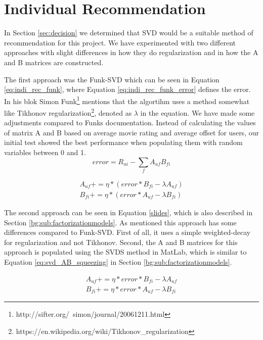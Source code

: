 \section{Individual Recommendation}\label{sec:individual_recommendation}
In Section \ref{sec:decision} we determined that SVD would be a suitable method of recommendation for this project. 
We have experimented with two different approaches with slight differences in how they do regularization and in how the A and B matrices are constructed.

The first approach was the Funk-SVD which can be seen in Equation \ref{eq:indi_rec_funk}, where Equation \ref{eq:indi_rec_funk_error} defines the error\cite{svdsimonfunk}. In his blok Simon Funk\footnote{http://sifter.org/~simon/journal/20061211.html} mentions that the algortihm uses a method somewhat like Tikhonov regularization\footnote{https://en.wikipedia.org/wiki/Tikhonov\_regularization}, denoted as $\lambda$ in the equation. We have made some adjustments compared to Funks documentation\cite{svdsimonfunk}. Instead of calculating the values of matrix A and B based on average movie rating and average offset for users, our initial test showed the best performance when populating them with random variables between 0 and 1.
\begin{equation}\label{eq:indi_rec_funk_error}
error = R_{ui} - \sum_f A_{uf}B_{fi}
\end{equation}

\begin{equation}\label{eq:indi_rec_funk}
\begin{aligned}
A_{uf} += \eta * (error * B_{fi} - \lambda A_{uf}) \\
B_{fi} += \eta * (error * A_{uf} - \lambda B_{fi})
\end{aligned}
\end{equation}

The second approach can be seen in Equation \ref{slides}, which is also described in Section \ref{bg:sub:factorizationmodels}. As mentioned this approach has some differences compared to Funk-SVD. First of all, it uses a simple weighted-decay for regularization and not Tikhonov. Second, the A and B matrices for this approach is populated using the SVDS method in MatLab, which is similar to Equation \ref{eq:svd_AB_squeezing} in Section \ref{bg:sub:factorizationmodels}.

\begin{equation}\label{slides}
\begin{aligned}
A_{uf} += \eta * error *B_{fi} - \lambda A_{uf} \\
B_{fi} += \eta * error *A_{uf} - \lambda B_{fi} 
\end{aligned}
\end{equation}

